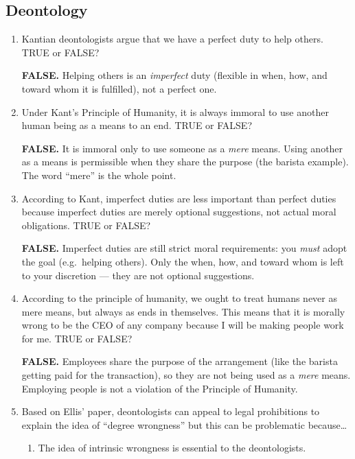 \documentclass[12pt]{article}
\begin{document}
\subsection{Deontology}
\begin{enumerate}
    \item Kantian deontologists argue that we have a perfect duty to help others. TRUE or FALSE?
    \begin{answer}\textbf{FALSE.} Helping others is an \emph{imperfect} duty (flexible in when, how, and toward whom it is fulfilled), not a perfect one.\end{answer}
    \item Under Kant's Principle of Humanity, it is always immoral to use another human being as a means to an end. TRUE or FALSE?
    \begin{answer}\textbf{FALSE.} It is immoral only to use someone as a \emph{mere} means. Using another as a means is permissible when they share the purpose (the barista example). The word ``mere'' is the whole point.\end{answer}
    \item According to Kant, imperfect duties are less important than perfect duties because imperfect duties are merely optional suggestions, not actual moral obligations. TRUE or FALSE?
    \begin{answer}\textbf{FALSE.} Imperfect duties are still strict moral requirements: you \emph{must} adopt the goal (e.g.\ helping others). Only the when, how, and toward whom is left to your discretion --- they are not optional suggestions.\end{answer}
    \item According to the principle of humanity, we ought to treat humans never as mere means, but always as ends in themselves. This means that it is morally wrong to be the CEO of any company because I will be making people work for me. TRUE or FALSE?
    \begin{answer}\textbf{FALSE.} Employees share the purpose of the arrangement (like the barista getting paid for the transaction), so they are not being used as a \emph{mere} means. Employing people is not a violation of the Principle of Humanity.\end{answer}
    \item Based on Ellis’ paper, deontologists can appeal to legal prohibitions to explain the idea of “degree wrongness” but this can be problematic because…
    \begin{enumerate}
        \item The idea of intrinsic wrongness is essential to the deontologists.

\end{enumerate}
\end{enumerate}
\end{document}
